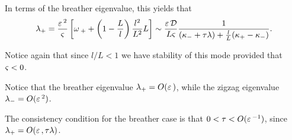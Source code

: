 \begin{itemize}
{	In terms of the breather eigenvalue, this yields that
	\begin{equation*}
	  \lambda_+ = \frac{\varepsilon\,^2}{\varsigma}\left[\omega\,_+ + \left(1-\frac{L}{l} \right)\frac{l^2}{L^2}L \right] \sim \frac{\varepsilon\,\mathcal{D}}{L\varsigma}\frac{1}{(\kappa_-+\tau\lambda) + \frac{l}{L}(\kappa_+-\kappa_-)}.
	\end{equation*}

	Notice again that since $l/L<1$ we have stability of this mode provided that $\varsigma<0$.

\begin{remark}
  Notice that the breather eigenvalue $\lambda_+ = O(\varepsilon\,)$, while the zigzag eigenvalue $\lambda_-=O(\varepsilon\,^2)$.

  The consistency condition for the breather case is that $0<\tau<O(\varepsilon\,^{-1})$, since $\lambda_+=O(\varepsilon\,,\tau\lambda)$.
\end{remark}

}
\end{itemize}



